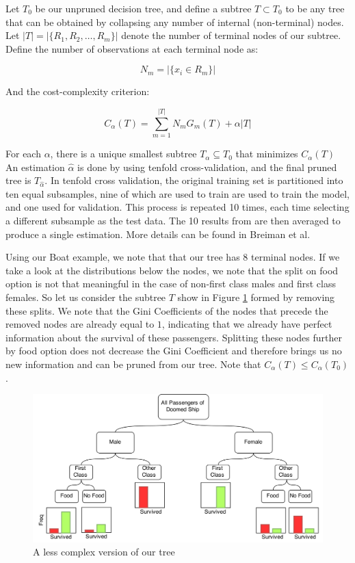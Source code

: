 \documentclass[preprint,12pt]{elsarticle}
\begin{document}
Let $T_{0}$ be our unpruned decision tree, and define a subtree $T \subset T_{0}$ to be any tree that can be obtained by collapsing any number of internal (non-terminal) nodes. Let $|T| = |\{R_{1}, R_{2}, \ldots, R_{m}\}|$ denote the number of terminal nodes of our subtree. Define the number of observations at each terminal node as:

$$N_{m} = |\{x_{i} \in R_{m}\}| $$

\noindent And the cost-complexity criterion:

$$C_{\alpha}(T) = \sum\limits_{m=1}^{|T|} N_{m}G_{m}(T) + \alpha|T|$$

For each $\alpha$, there is a unique smallest subtree $T_{\alpha} \subseteq T_{0}$ that minimizes $C_{\alpha}(T)$ An estimation  $\hat{\alpha}$ is done by using tenfold cross-validation, and the final pruned tree is $T_{\hat{\alpha}}$. In tenfold cross validation, the original training set is partitioned into ten equal subsamples, nine of which are used to train are used to train the model, and one used for validation. This process is repeated 10 times, each time selecting a different subsample as the test data. The 10 results from are then averaged to produce a single estimation. More details can be found in Breiman et al.\cite{Breiman1984}

Using our Boat example, we note that that our tree has 8 terminal nodes. If we take a look at the distributions below the nodes, we note that the split on food option is not that meaningful in the case of non-first class males and first class females. So let us consider the subtree $T$ show in Figure \ref{fig:Pruned} formed by removing these splits. We note that the Gini Coefficients of the nodes that precede the removed nodes are already equal to $1$, indicating that we already have perfect information about the survival of these passengers. Splitting these nodes further by food option does not decrease the Gini Coefficient and therefore brings us no new information and can be pruned from our tree. Note that $C_{\alpha}(T) \leq C_{\alpha}(T_{0})$.

\begin{figure}[h]
	\centering
	\includegraphics[width=1\textwidth]{PrunedBoat}
	\caption{A less complex version of our tree}
	\label{fig:Pruned}
\end{figure}
\end{document}
